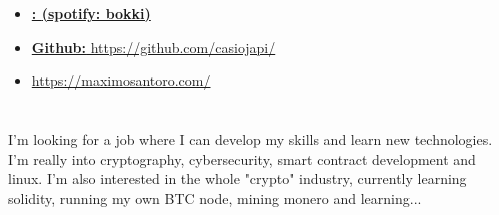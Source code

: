 \documentclass[10pt,a4paper]{moderncv}
\begin{document}
\section{}
\begin{itemize}
    \item \textbf{{\href{https://open.spotify.com/artist/1gmAvUNIqrPSGklxtoj514?si=zmeSuhggQwSlc_M0m4N1xA}{{{: }}(spotify: bokki)}}}
    \item {\href{https://github.com/casiojapi/}{\textbf{Github: }https://github.com/casiojapi/}}
    \item {\href{https://maximosantoro.com/}{\textbf{}https://maximosantoro.com/}}
    
\end{itemize}
\section{}
{I'm looking for a job where I can develop my skills and learn new technologies. I'm really into cryptography, cybersecurity, smart contract development and linux. I'm also interested in the whole "crypto" industry, currently learning solidity, running my own BTC node, mining monero and learning...}
\end{document}

